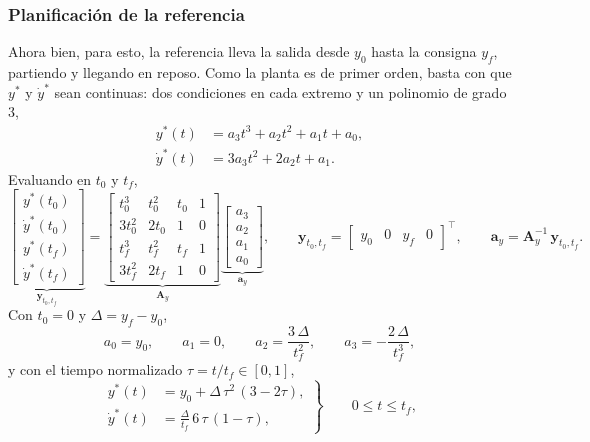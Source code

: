 \subsubsection{Planificación de la referencia}
\label{subsec:bz_planificacion}
Ahora bien, para esto, la referencia lleva la salida desde $y_0$ hasta la consigna $y_f$, partiendo y
llegando en reposo. Como la planta es de primer orden, basta con que $y^*$ y
$\dot{y}^*$ sean continuas: dos condiciones en cada extremo y un polinomio de
grado 3,
\begin{equation}
\begin{aligned}
y^*(t) &= a_3 t^3 + a_2 t^2 + a_1 t + a_0 , \\
\dot{y}^*(t) &= 3a_3 t^2 + 2a_2 t + a_1 .
\end{aligned}
\label{eq:bz_pol}
\end{equation}
Evaluando en $t_0$ y $t_f$,
\begin{equation}
\underbrace{\begin{bmatrix} y^*(t_0) \\ \dot{y}^*(t_0) \\ y^*(t_f) \\ \dot{y}^*(t_f) \end{bmatrix}}_{\mathbf{y}_{t_0,t_f}}
=
\underbrace{\begin{bmatrix}
t_0^3 & t_0^2 & t_0 & 1 \\
3t_0^2 & 2t_0 & 1 & 0 \\
t_f^3 & t_f^2 & t_f & 1 \\
3t_f^2 & 2t_f & 1 & 0
\end{bmatrix}}_{\mathbf{A}_y}
\underbrace{\begin{bmatrix} a_3 \\ a_2 \\ a_1 \\ a_0 \end{bmatrix}}_{\mathbf{a}_y} ,
\qquad
\mathbf{y}_{t_0,t_f} = \begin{bmatrix} y_0 & 0 & y_f & 0 \end{bmatrix}^{\top} ,
\qquad
\mathbf{a}_y = \mathbf{A}_y^{-1}\,\mathbf{y}_{t_0,t_f} .
\label{eq:bz_sistema}
\end{equation}
Con $t_0 = 0$ y $\Delta = y_f - y_0$,
\begin{equation}
a_0 = y_0 , \qquad a_1 = 0 , \qquad a_2 = \frac{3\,\Delta}{t_f^2} , \qquad a_3 = -\frac{2\,\Delta}{t_f^3} ,
\label{eq:bz_cerrada}
\end{equation}
y con el tiempo normalizado $\tau = t/t_f \in [0, 1]$,
\begin{equation}
\left.
\begin{aligned}
y^*(t) &= y_0 + \Delta\,\tau^2\,(3 - 2\tau) , \\
\dot{y}^*(t) &= \frac{\Delta}{t_f}\,6\,\tau\,(1 - \tau) ,
\end{aligned}
\right\}
\qquad 0 \le t \le t_f ,
\label{eq:bz_normalizada}
\end{equation}
